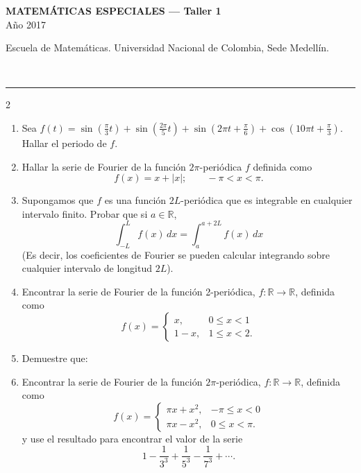 \documentclass[11pt]{article}
\newcommand{\examheader}[2]{%
  \noindent
  \begin{minipage}[t]{0.6\linewidth}
    {\small\bfseries MATEM\'ATICAS ESPECIALES --- #1}\\
    {\small #2}
  \end{minipage}%
  \hfill
  \begin{minipage}[t]{0.35\linewidth}
    \raggedleft\small Escuela de Matem\'aticas. Universidad Nacional de Colombia, Sede Medell\'in.
  \end{minipage}\\[2pt]
  \rule{\linewidth}{0.6pt}
}
\begin{document}
\examheader{Taller 1}{A\~no 2017}

\columnseprule=0.5pt
\begin{multicols}{2}
\begin{enumerate}
\item Sea $f(t) = \sin(\tfrac{\pi}{3}t) + \sin(\tfrac{2\pi}{5}t) + \sin(2\pi t + \tfrac{\pi}{6}) + \cos(10\pi t + \tfrac{\pi}{3})$. Hallar el periodo de $f$.

\item Hallar la serie de Fourier de la función $2\pi$-periódica $f$ definida como
\[
f(x) = x + |x|; \qquad -\pi < x < \pi.
\]

\item Supongamos que $f$ es una función $2L$-periódica que es integrable en cualquier intervalo finito. Probar que si $a \in \mathbb{R}$,
\[
\int_{-L}^{L} f(x)\,dx = \int_{a}^{a+2L} f(x)\,dx
\]
(Es decir, los coeficientes de Fourier se pueden calcular integrando sobre cualquier intervalo de longitud $2L$).

\item Encontrar la serie de Fourier de la función 2-periódica, $f:\mathbb{R}\to\mathbb{R}$, definida como
\[
f(x) = \begin{cases} x, & 0 \le x < 1 \\ 1-x, & 1 \le x < 2. \end{cases}
\]

\item Demuestre que:

\item Encontrar la serie de Fourier de la función $2\pi$-periódica, $f:\mathbb{R}\to\mathbb{R}$, definida como
\[
f(x) = \begin{cases} \pi x + x^2, & -\pi \le x < 0 \\ \pi x - x^2, & 0 \le x < \pi. \end{cases}
\]
y use el resultado para encontrar el valor de la serie
\[
1 - \frac{1}{3^3} + \frac{1}{5^3} - \frac{1}{7^3} + \cdots.
\]
\end{enumerate}
\end{multicols}
\end{document}
